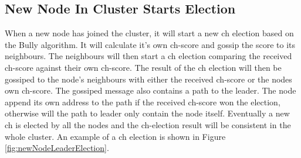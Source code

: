 \documentclass[USenglish]{uit-thesis}
\begin{document}
\subsection{New Node In Cluster Starts Election}
When a new node has joined the cluster, it will start a new \gls{ch} election based on the Bully algorithm. It will calculate it's own \gls{ch}-score and gossip the score to its neighbours. The neighbours will then start a \gls{ch} election comparing the received \gls{ch}-score against their own \gls{ch}-score. The result of the \gls{ch} election will then be gossiped to the node's neighbours with either the received \gls{ch}-score or the nodes own \gls{ch}-score. The gossiped message also contains a path to the leader. The node append its own address to the path if the received \gls{ch}-score won the election, otherwise will the path to leader only contain the node itself. Eventually a new \gls{ch} is elected by all the nodes and the \gls{ch}-election result will be consistent in the whole cluster. An example of a \gls{ch} election is shown in Figure \ref{fig:newNodeLeaderElection}.
\end{document}
